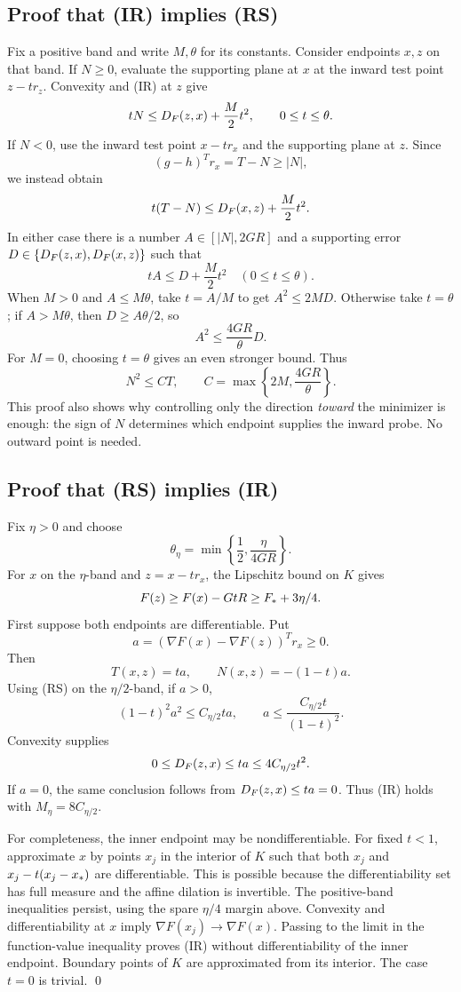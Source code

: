 \subsection{Proof that (IR) implies (RS)}
Fix a positive band and write $M,\theta$ for its constants. Consider endpoints $x,z$ on that band. If $N\ge0$, evaluate the supporting plane at $x$ at the inward test point $z-t r_z$. Convexity and (IR) at $z$ give
\[
 tN\le D_F(z,x)+\frac M2t^2,\qquad 0\le t\le\theta.
\]
If $N<0$, use the inward test point $x-t r_x$ and the supporting plane at $z$. Since
\[
 (g-h)^Tr_x=T-N\ge|N|,
\]
we instead obtain
\[
 t(T-N)\le D_F(x,z)+\frac M2t^2.
\]
In either case there is a number $A\in[|N|,2GR]$ and a supporting error $D\in\{D_F(z,x),D_F(x,z)\}$ such that
\[
 tA\le D+\frac M2t^2\quad(0\le t\le\theta).
\]
When $M>0$ and $A\le M\theta$, take $t=A/M$ to get $A^2\le2MD$. Otherwise take $t=\theta$; if $A>M\theta$, then $D\ge A\theta/2$, so
\[
 A^2\le \frac{4GR}{\theta}D.
\]
For $M=0$, choosing $t=\theta$ gives an even stronger bound. Thus
\begin{equation}
 N^2\le C T,\qquad
 C=\max\left\{2M,\frac{4GR}{\theta}\right\}.
 \label{R:eq:IRtoRS}
\end{equation}
This proof also shows why controlling only the direction \emph{toward} the minimizer is enough: the sign of $N$ determines which endpoint supplies the inward probe. No outward point is needed.

\subsection{Proof that (RS) implies (IR)}
Fix $\eta>0$ and choose
\[
 \theta_\eta=\min\left\{\frac12,\frac{\eta}{4GR}\right\}.
\]
For $x$ on the $\eta$-band and $z=x-t r_x$, the Lipschitz bound on $K$ gives
\[
 F(z)\ge F(x)-GtR\ge F_*+3\eta/4.
\]
First suppose both endpoints are differentiable. Put
\[
 a=(\nabla F(x)-\nabla F(z))^Tr_x\ge0.
\]
Then
\[
 T(x,z)=ta,\qquad N(x,z)=-(1-t)a.
\]
Using (RS) on the $\eta/2$-band, if $a>0$,
\[
 (1-t)^2a^2\le C_{\eta/2}ta,
 \qquad
 a\le\frac{C_{\eta/2}t}{(1-t)^2}.
\]
Convexity supplies
\[
 0\le D_F(z,x)\le ta\le4C_{\eta/2}t^2.
\]
If $a=0$, the same conclusion follows from $D_F(z,x)\le ta=0$. Thus (IR) holds with $M_\eta=8C_{\eta/2}$.

For completeness, the inner endpoint may be nondifferentiable. For fixed $t<1$, approximate $x$ by points $x_j$ in the interior of $K$ such that both $x_j$ and $x_j-t(x_j-x_*)$ are differentiable. This is possible because the differentiability set has full measure and the affine dilation is invertible. The positive-band inequalities persist, using the spare $\eta/4$ margin above. Convexity and differentiability at $x$ imply $\nabla F(x_j)\to\nabla F(x)$. Passing to the limit in the function-value inequality proves (IR) without differentiability of the inner endpoint. Boundary points of $K$ are approximated from its interior. The case $t=0$ is trivial. \qed

